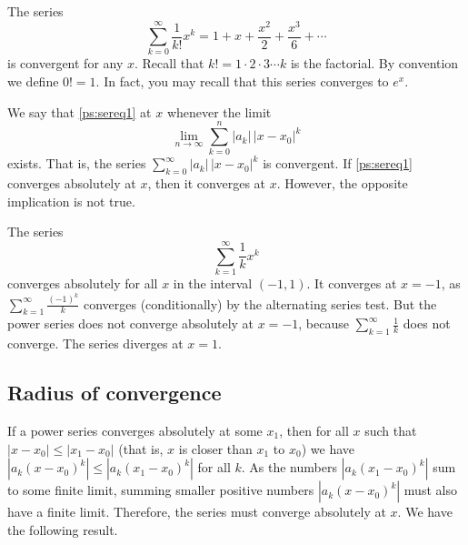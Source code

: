 \begin{example} \label{ps:expex}
The series
\begin{equation*}
\sum_{k=0}^\infty \frac{1}{k!} x^k = 
1 + x + \frac{x^2}{2} + \frac{x^3}{6} + \cdots
\end{equation*}
is convergent for any $x$.
Recall that $k! = 1\cdot 2\cdot 3 \cdots k$ is the
factorial.  By convention we define $0! = 1$.
In fact, you may recall that this series
converges to $e^x$.
\end{example}

We say that \eqref{ps:sereq1}
\emph{}
at $x$ whenever the limit
\begin{equation*}
\lim_{n\to\infty} \sum_{k=0}^n
\lvert a_k \rvert \, {\lvert x-x_0 \rvert}^k 
\end{equation*}
exists.  That is, the series
$\sum_{k=0}^\infty \lvert a_k \rvert \, {\lvert x-x_0 \rvert}^k$
is convergent.
If \eqref{ps:sereq1} converges absolutely at $x$, then it
converges at $x$.  However, the opposite implication is not true.

\begin{example} \label{ps:1kex}
The series
\begin{equation*}
\sum_{k=1}^\infty \frac{1}{k} x^k
\end{equation*}
converges absolutely for all $x$ in the interval $(-1,1)$.
It converges at $x=-1$,
as
$\sum_{k=1}^\infty \frac{{(-1)}^k}{k}$ converges (conditionally)
by the alternating series
test.
But the power series does not converge absolutely at $x=-1$, because
$\sum_{k=1}^\infty \frac{1}{k}$ does not converge.
The series
diverges at $x=1$.
\end{example}

\subsection{Radius of convergence}

If a power series converges absolutely
at some $x_1$, then for all $x$ such that
$\lvert x - x_0  \rvert \leq \lvert x_1 - x_0 \vert$ (that is, $x$ is
closer than $x_1$ to $x_0$) we have
$\left\lvert a_k {(x-x_0)}^k \right\rvert \leq
\left\lvert a_k {(x_1-x_0)}^k \right\rvert$
for all $k$.
As the numbers $\left\lvert a_k {(x_1-x_0)}^k \right\rvert$ sum to some finite
limit, summing smaller positive numbers
$\left\lvert a_k {(x-x_0)}^k \right\rvert$ must also have a finite limit.
Therefore, the series must converge
absolutely at $x$.  We have the following result.

